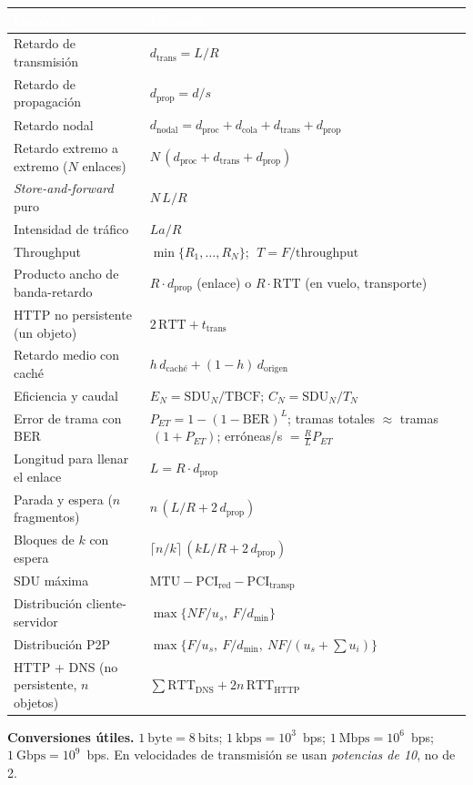\documentclass[11pt,a4paper]{article}
\newcommand{\hd}[1]{\cellcolor{uahblue}\textcolor{white}{\textbf{#1}}}
\begin{document}
\begin{tabularx}{\textwidth}{@{}L{5.6cm}X@{}}
\toprule
\hd{Concepto} & \hd{Fórmula} \\
\midrule
Retardo de transmisión & $d_{\text{trans}}=L/R$ \\
Retardo de propagación & $d_{\text{prop}}=d/s$ \\
Retardo nodal & $d_{\text{nodal}}=d_{\text{proc}}+d_{\text{cola}}+d_{\text{trans}}+d_{\text{prop}}$ \\
Retardo extremo a extremo ($N$ enlaces) & $N\,(d_{\text{proc}}+d_{\text{trans}}+d_{\text{prop}})$ \\
\textit{Store-and-forward} puro & $N\,L/R$ \\
Intensidad de tráfico & $La/R$ \\
Throughput & $\min\{R_1,\dots,R_N\}$; $\;T=F/\text{throughput}$ \\
Producto ancho de banda-retardo & $R\cdot d_{\text{prop}}$ (enlace) o $R\cdot\text{RTT}$ (en vuelo, transporte) \\
HTTP no persistente (un objeto) & $2\,\text{RTT}+t_{\text{trans}}$ \\
Retardo medio con caché & $h\,d_{\text{caché}}+(1-h)\,d_{\text{origen}}$ \\
Eficiencia y caudal & $E_N=\text{SDU}_N/\text{TBCF}$; $C_N=\text{SDU}_N/T_N$ \\
Error de trama con BER & $P_{ET}=1-(1-\text{BER})^{L}$; tramas totales $\approx$ tramas$\,(1+P_{ET})$; erróneas/s $=\tfrac{R}{L}P_{ET}$ \\
Longitud para llenar el enlace & $L=R\cdot d_{\text{prop}}$ \\
Parada y espera ($n$ fragmentos) & $n\,(L/R+2\,d_{\text{prop}})$ \\
Bloques de $k$ con espera & $\lceil n/k\rceil\,(kL/R+2\,d_{\text{prop}})$ \\
SDU máxima & $\text{MTU}-\text{PCI}_{\text{red}}-\text{PCI}_{\text{transp}}$ \\
Distribución cliente-servidor & $\max\{NF/u_s,\ F/d_{\min}\}$ \\
Distribución P2P & $\max\{F/u_s,\ F/d_{\min},\ NF/(u_s+\sum u_i)\}$ \\
HTTP + DNS (no persistente, $n$ objetos) & $\sum \text{RTT}_{\text{DNS}}+2n\,\text{RTT}_{\text{HTTP}}$ \\
\bottomrule
\end{tabularx}

\textbf{Conversiones útiles.} $1~\text{byte}=8~\text{bits}$; $1~\text{kbps}=10^{3}$~bps; $1~\text{Mbps}=10^{6}$~bps; $1~\text{Gbps}=10^{9}$~bps. En velocidades de transmisión se usan \emph{potencias de 10}, no de 2.
\end{document}
